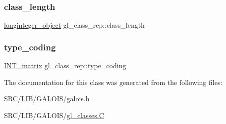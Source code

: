 \subsubsection{\texorpdfstring{class\+\_\+length}{class\_length}}
{\footnotesize\ttfamily \mbox{\hyperlink{classlonginteger__object}{longinteger\+\_\+object}} gl\+\_\+class\+\_\+rep\+::class\+\_\+length}

\mbox{\label{classgl__class__rep_af2df296c4e1491694e9d4ed68290b4f6}} 
\subsubsection{\texorpdfstring{type\+\_\+coding}{type\_coding}}
{\footnotesize\ttfamily \mbox{\hyperlink{class_i_n_t__matrix}{I\+N\+T\+\_\+matrix}} gl\+\_\+class\+\_\+rep\+::type\+\_\+coding}



The documentation for this class was generated from the following files\+:\begin{DoxyCompactItemize}
\item 
S\+R\+C/\+L\+I\+B/\+G\+A\+L\+O\+I\+S/\mbox{\hyperlink{galois_8h}{galois.\+h}}\item 
S\+R\+C/\+L\+I\+B/\+G\+A\+L\+O\+I\+S/\mbox{\hyperlink{gl__classes_8_c}{gl\+\_\+classes.\+C}}\end{DoxyCompactItemize}
